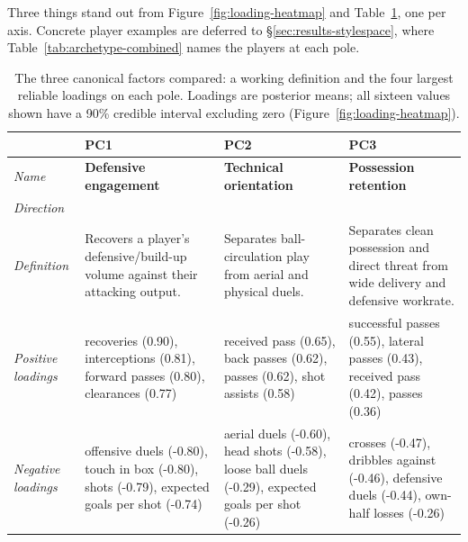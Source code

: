 Three things stand out from Figure~\ref{fig:loading-heatmap} and Table~\ref{tab:pc-comparison}, one per axis.
Concrete player examples are deferred to \S\ref{sec:results-stylespace}, where
Table~\ref{tab:archetype-combined} names the players at each pole.

\begin{table}[tbp]
\centering
\caption{The three canonical factors compared: a working definition and the four largest reliable loadings on
each pole. Loadings are posterior means; all sixteen values shown have a 90\% credible interval excluding
zero (Figure~\ref{fig:loading-heatmap}).}
\label{tab:pc-comparison}
\newcommand{\poleaxis}[2]{%
  \begin{tikzpicture}[baseline=-0.5ex]
    \draw[<->, semithick] (0,0) -- (2.3,0);
    \node[fill=white, inner sep=1pt, font=\scriptsize] at (1.15,0) {0};
    \node[anchor=north, font=\scriptsize] at (0,-0.06) {#1};
    \node[anchor=north, font=\scriptsize] at (2.3,-0.06) {#2};
  \end{tikzpicture}%
}
\begin{tabularx}{\textwidth}{lXXX}
\toprule
 & \hfil\textbf{PC1}\hfil & \hfil\textbf{PC2}\hfil & \hfil\textbf{PC3}\hfil \\
\midrule
\textit{Name} &
\textbf{Defensive engagement} &
\textbf{Technical orientation} &
\textbf{Possession retention} \\[0.4em]
\textit{Direction} &
\hfil\poleaxis{attacking}{defensive}\hfil &
\hfil\poleaxis{aerial}{technical}\hfil &
\hfil\poleaxis{crossing}{retention}\hfil \\[0.9em]
\textit{Definition} &
Recovers a player's defensive/build-up volume against their attacking output. &
Separates ball-circulation play from aerial and physical duels. &
Separates clean possession and direct threat from wide delivery and defensive workrate. \\[0.9em]
\parbox[t]{1.8cm}{\raggedright\textit{Positive loadings}} &
recoveries (0.90), interceptions (0.81), forward passes (0.80), clearances (0.77) &
received pass (0.65), back passes (0.62), passes (0.62), shot assists (0.58) &
successful passes (0.55), lateral passes (0.43), received pass (0.42), passes (0.36) \\[0.9em]
\parbox[t]{1.8cm}{\raggedright\textit{Negative loadings}} &
offensive duels (-0.80), touch in box (-0.80), shots (-0.79), expected goals per shot (-0.74) &
aerial duels (-0.60), head shots (-0.58), loose ball duels (-0.29), expected goals per shot (-0.26) &
crosses (-0.47), dribbles against (-0.46), defensive duels (-0.44), own-half losses (-0.26) \\
\bottomrule
\end{tabularx}
\end{table}

